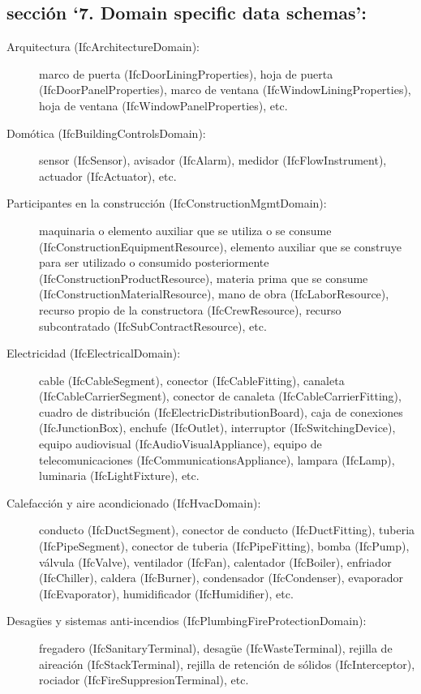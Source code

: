 \documentclass[spanish,12pt,a4paper,final,oneside]{book}
\begin{document}
\subsection{sección `7. Domain specific data schemas':}

\begin{description}
\item[Arquitectura (IfcArchitectureDomain):] marco de puerta (IfcDoorLiningProperties), hoja de puerta (IfcDoorPanelProperties), marco de ventana (IfcWindowLiningProperties), hoja de ventana (IfcWindowPanelProperties), etc.

\item[Domótica (IfcBuildingControlsDomain):] sensor (IfcSensor), avisador (IfcAlarm), medidor (IfcFlowInstrument), actuador (IfcActuator), etc.

\item[Participantes en la construcción (IfcConstructionMgmtDomain):] maquinaria o elemento auxiliar  que se utiliza o se consume (IfcConstructionEquipmentResource), elemento auxiliar que se construye para ser utilizado o consumido posteriormente (IfcConstructionProductResource),  materia prima que se consume (IfcConstructionMaterialResource), mano de obra (IfcLaborResource), recurso propio de la constructora (IfcCrewResource), recurso subcontratado (IfcSubContractResource), etc.

\item[Electricidad (IfcElectricalDomain):] cable (IfcCableSegment), conector (IfcCableFitting), canaleta (IfcCableCarrierSegment), conector de canaleta (IfcCableCarrierFitting), cuadro de distribución (IfcElectricDistributionBoard), caja de conexiones (IfcJunctionBox), enchufe (IfcOutlet), interruptor (IfcSwitchingDevice), equipo audiovisual (IfcAudioVisualAppliance), equipo de telecomunicaciones (IfcCommunicationsAppliance), lampara (IfcLamp), luminaria (IfcLightFixture), etc.

\item[Calefacción y aire acondicionado (IfcHvacDomain):] conducto (IfcDuctSegment), conector de conducto (IfcDuctFitting), tuberia (IfcPipeSegment), conector de tuberia (IfcPipeFitting), bomba (IfcPump), válvula (IfcValve), ventilador (IfcFan), calentador (IfcBoiler), enfriador (IfcChiller), caldera (IfcBurner), condensador (IfcCondenser), evaporador (IfcEvaporator), humidificador (IfcHumidifier), etc.

\item[Desagües y sistemas anti-incendios (IfcPlumbingFireProtectionDomain):] fregadero (IfcSanitaryTerminal), desagüe (IfcWasteTerminal), rejilla de aireación (IfcStackTerminal), rejilla de retención de sólidos (IfcInterceptor), rociador (IfcFireSuppresionTerminal), etc.


\end{description}
\end{document}
